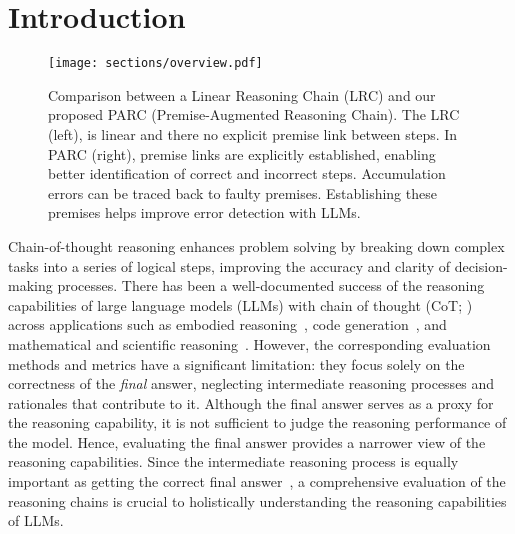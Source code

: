\section{Introduction}
\begin{figure*}[t!]
    \centering
    \texttt{[image: sections/overview.pdf]}
    \vspace{-3ex}
    \caption{Comparison between a Linear Reasoning Chain (LRC) and our proposed PARC (Premise-Augmented Reasoning Chain). The LRC (left), is linear and there no explicit premise link between steps. In PARC (right), premise links are explicitly established, enabling better identification of correct and incorrect steps. Accumulation errors can be traced back to faulty premises. Establishing these premises helps improve error detection with LLMs.}
    \label{fig:overview}
    \vspace{-3ex}
\end{figure*}
Chain-of-thought reasoning enhances problem solving by breaking down complex tasks into a series of logical steps, improving the accuracy and clarity of decision-making processes.
There has been a well-documented success of the reasoning capabilities of large language models (LLMs) with chain of thought (CoT; \citet{wei2023chainofthoughtpromptingelicitsreasoning}) across applications such as embodied reasoning~\cite{NEURIPS2023_3d0758f0, philipov2024simulatinguseragentsembodied}, code generation~\cite{jiang2024surveylargelanguagemodels}, and mathematical and scientific reasoning~\cite{imani-etal-2023-mathprompter, ahn2024largelanguagemodelsmathematical}.  However, the corresponding evaluation methods and metrics have a significant limitation: they focus solely on the correctness of the \textit{final} answer, neglecting intermediate reasoning processes and rationales that contribute to it. Although the final answer serves as a proxy for the reasoning capability, it is not sufficient to judge the reasoning performance of the model. Hence, evaluating the final answer provides a narrower view of the reasoning capabilities. Since the intermediate reasoning process is equally important as getting the correct final answer~\cite{huang2023reasoninglargelanguagemodels, golovneva2023roscoesuitemetricsscoring, prasad2023recevalevaluatingreasoningchains}, a comprehensive evaluation of the reasoning chains is crucial to holistically understanding the reasoning capabilities of LLMs. 

